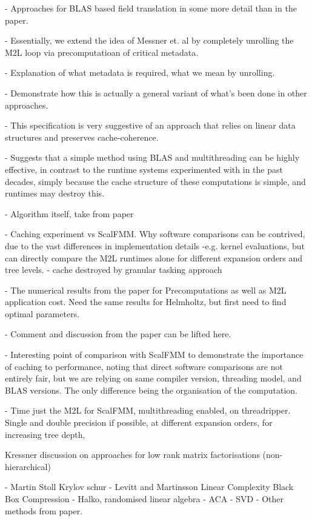 - Approaches for BLAS based field translation in some more detail than in the paper.

- Essentially, we extend the idea of Messner et. al by completely unrolling the M2L loop via precomputatioan of critical metadata.

- Explanation of what metadata is required, what we mean by unrolling.

- Demonstrate how this is actually a general variant of what's been done in other approaches.

- This specification is very suggestive of an approach that relies on linear data structures and preserves cache-coherence.

- Suggests that a simple method using BLAS and multithreading can be highly effective, in contrast to the runtime systems experimented with in the past decades, simply because the cache structure of these computations is simple, and runtimes may destroy this.

- Algorithm itself, take from paper

- Caching experiment vs ScalFMM. Why software comparisons can be contrived, due to the vast differences in implementation details -e.g. kernel evaluations, but can directly compare the M2L runtimes alone for different expansion orders and tree levels.
    - cache destroyed by granular tasking approach

- The numerical results from the paper for Precomputations as well as M2L application cost. Need the same results for Helmholtz, but first need to find optimal parameters.

- Comment and discussion from the paper can be lifted here.

- Interesting point of comparison with ScalFMM to demonstrate the importance of caching to performance, noting that direct software comparisons are not entirely fair, but we are relying on same compiler version, threading model, and BLAS versions. The only difference being the organisation of the computation.

- Time just the M2L for ScalFMM, multithreading enabled, on threadripper. Single and double precision if possible, at different expansion orders, for increasing tree depth,

Kressner discussion on approaches for low rank matrix factorisations (non-hierarchical)

- Martin Stoll Krylov schur
- Levitt and Martinsson Linear Complexity Black Box Compression
- Halko, randomised linear algebra
- ACA
- SVD
- Other methods from paper.
